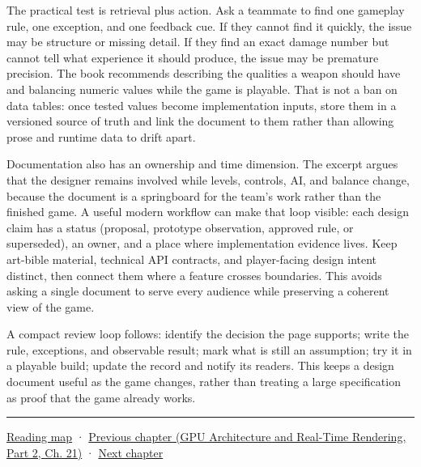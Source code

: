 The practical test is retrieval plus action. Ask a teammate to find one gameplay rule, one exception, and one feedback cue. If they cannot find it quickly, the issue may be structure or missing detail. If they find an exact damage number but cannot tell what experience it should produce, the issue may be premature precision. The book recommends describing the qualities a weapon should have and balancing numeric values while the game is playable. That is not a ban on data tables: once tested values become implementation inputs, store them in a versioned source of truth and link the document to them rather than allowing prose and runtime data to drift apart.

Documentation also has an ownership and time dimension. The excerpt argues that the designer remains involved while levels, controls, AI, and balance change, because the document is a springboard for the team's work rather than the finished game. A useful modern workflow can make that loop visible: each design claim has a status (proposal, prototype observation, approved rule, or superseded), an owner, and a place where implementation evidence lives. Keep art-bible material, technical API contracts, and player-facing design intent distinct, then connect them where a feature crosses boundaries. This avoids asking a single document to serve every audience while preserving a coherent view of the game.

A compact review loop follows: identify the decision the page supports; write the rule, exceptions, and observable result; mark what is still an assumption; try it in a playable build; update the record and notify its readers. This keeps a design document useful as the game changes, rather than treating a large specification as proof that the game already works.

\begin{center}\rule{0.5\linewidth}{0.5pt}\end{center}

\hyperref[volume-reading-map]{Reading map} · \href{../06-GPU-Architecture-and-Real-Time-Rendering-P02/main.pdf\#06-engine-ii-ch045-rasterizing-kernels-and-connecting-world-identity}{Previous chapter (GPU Architecture and Real-Time Rendering, Part 2, Ch. 21)} · \hyperref[06-engine-ii-ch047-narrative-simulation-and-ai-in-playable-worlds]{Next chapter}
